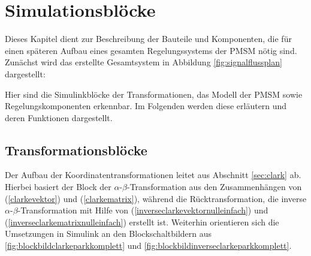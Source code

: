 

\section{Simulationsblöcke}\label{sec:math-model-pmsm}

Dieses Kapitel dient zur Beschreibung der Bauteile und Komponenten, die für einen späteren Aufbau eines gesamten Regelungssystems der PMSM nötig sind.
Zunächst wird das erstellte Gesamtsystem in Abbildung \ref{fig:signalflussplan} dargestellt:

\newpage
\begin{landscape}
	
\end{landscape}

Hier sind die Simulinkblöcke der Transformationen, das Modell der PMSM sowie Regelungskomponenten erkennbar.
Im Folgenden werden diese erläutern und deren Funktionen dargestellt.

\subsection{Transformationsblöcke}

Der Aufbau der Koordinatentransformationen leitet aus Abschnitt \ref{sec:clark} ab. 
Hierbei basiert der Block der $\alpha$-$\beta$-Transformation aus den Zusammenhängen von (\ref{clarkevektor}) und (\ref{clarkematrix}), während die Rücktransformation, die inverse $\alpha$-$\beta$-Transformation mit Hilfe von (\ref{inverseclarkevektornulleinfach}) und (\ref{inverseclarkematrixnulleinfach}) erstellt ist.
Weiterhin orientieren sich die Umsetzungen in Simulink an den Blockschaltbildern aus \ref{fig:blockbildclarkeparkkomplett} und \ref{fig:blockbildinverseclarkeparkkomplett}.



